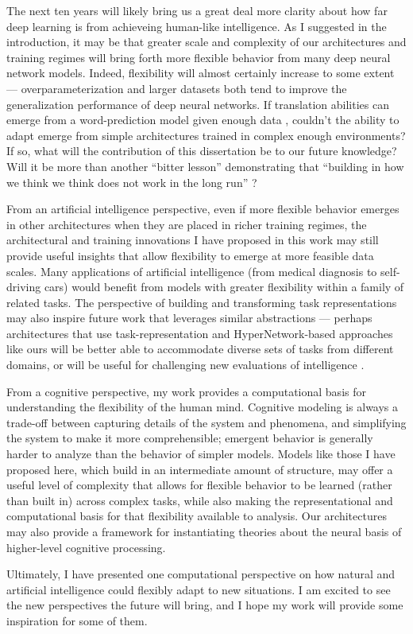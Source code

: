 The next ten years will likely bring us a great deal more clarity about how far deep learning is from achieveing human-like intelligence. As I suggested in the introduction, it may be that greater scale and complexity of our architectures and training regimes will bring forth more flexible behavior from many deep neural network models. Indeed, flexibility will almost certainly increase to some extent --- overparameterization and larger datasets both tend to improve the generalization performance of deep neural networks. If translation abilities can emerge from a word-prediction model given enough data \citep{Radford2019}, couldn't the ability to adapt emerge from simple architectures trained in complex enough environments? If so, what will the contribution of this dissertation be to our future knowledge? Will it be more than another ``bitter lesson'' demonstrating that ``building in how we think we think does not work in the long run'' \citep{Sutton2019}? \par 

From an artificial intelligence perspective, even if more flexible behavior emerges in other architectures when they are placed in richer training regimes, the architectural and training innovations I have proposed in this work may still provide useful insights that allow flexibility to emerge at more feasible data scales. Many applications of artificial intelligence (from medical diagnosis to self-driving cars) would benefit from models with greater flexibility within a family of related tasks. The perspective of building and transforming task representations may also inspire future work that leverages similar abstractions --- perhaps architectures that use task-representation and HyperNetwork-based approaches like ours will be better able to accommodate diverse sets of tasks from different domains, or will be useful for challenging new evaluations of intelligence \citep[e.g.][]{Chollet2019}. \par 

From a cognitive perspective, my work provides a computational basis for understanding the flexibility of the human mind. Cognitive modeling is always a trade-off between capturing details of the system and phenomena, and simplifying the system to make it more comprehensible; emergent behavior is generally harder to analyze than the behavior of simpler models. Models like those I have proposed here, which build in an intermediate amount of structure, may offer a useful level of complexity that allows for flexible behavior to be learned (rather than built in) across complex tasks, while also making the representational and computational basis for that flexibility available to analysis. Our architectures may also provide a framework for instantiating theories about the neural basis of higher-level cognitive processing. \par 

Ultimately, I have presented one computational perspective on how natural and artificial intelligence could flexibly adapt to new situations. I am excited to see the new perspectives the future will bring, and I hope my work will provide some inspiration for some of them. 
